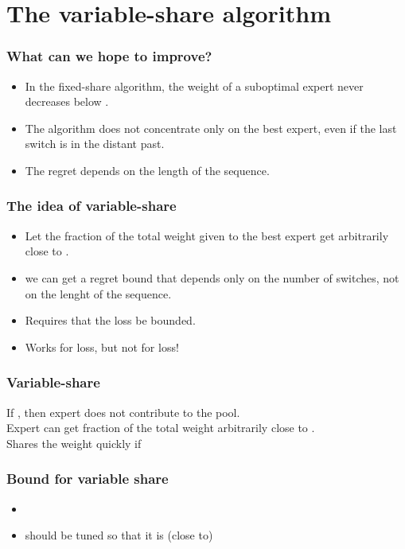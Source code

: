 \documentclass[handout]{beamer}
\begin{document}
\section{The variable-share algorithm}

\begin{frame}
\frametitle{What can we hope to improve?}
\begin{itemize}
\item In the fixed-share algorithm, the 
weight of a suboptimal expert never decreases below
.
\item The algorithm does not concentrate only on the best expert, even
if the last switch is in the distant past.
\item The regret depends on the length of the sequence.
\end{itemize}
\end{frame}

\begin{frame}
\frametitle{The idea of variable-share}
\begin{itemize}
\item Let the fraction of the total weight given to the 
best expert get arbitrarily close to .
\item we can get a regret bound that depends only on the number of
switches, not on the lenght of the sequence.
\item Requires that the loss be bounded.
\item Works for  loss, but not for  loss!
\end{itemize}
\end{frame}

\begin{frame}
\frametitle{Variable-share}
\pause
If , then expert  does not contribute to the pool.\\
\pause
Expert can get fraction of the total weight arbitrarily close to .\\
\pause
Shares the weight quickly if 
\end{frame}

\begin{frame}
\frametitle{Bound for variable share}
\begin{itemize}
\item
{}
\item \R{$\alpha$} should be tuned so that it is (close to) 
\end{itemize}
\end{frame}
\end{document}
